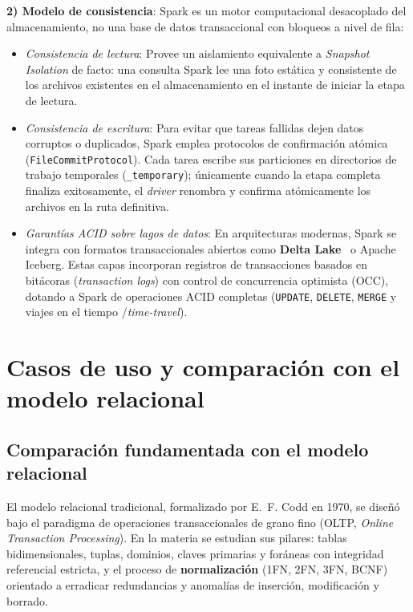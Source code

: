 \documentclass[conference,a4paper]{IEEEtran}
\begin{document}
\textbf{2) Modelo de consistencia}: Spark es un motor computacional desacoplado del almacenamiento, no una base de datos transaccional con bloqueos a nivel de fila:
\begin{itemize}
\item \textit{Consistencia de lectura}: Provee un aislamiento equivalente a \textit{Snapshot Isolation} de facto: una consulta Spark lee una foto estática y consistente de los archivos existentes en el almacenamiento en el instante de iniciar la etapa de lectura.
\item \textit{Consistencia de escritura}: Para evitar que tareas fallidas dejen datos corruptos o duplicados, Spark emplea protocolos de confirmación atómica (\texttt{FileCommitProtocol}). Cada tarea escribe sus particiones en directorios de trabajo temporales (\texttt{\_temporary}); únicamente cuando la etapa completa finaliza exitosamente, el \textit{driver} renombra y confirma atómicamente los archivos en la ruta definitiva.
\item \textit{Garantías ACID sobre lagos de datos}: En arquitecturas modernas, Spark se integra con formatos transaccionales abiertos como \textbf{Delta Lake}~\cite{armbrust2020deltalake} o Apache Iceberg. Estas capas incorporan registros de transacciones basados en bitácoras (\textit{transaction logs}) con control de concurrencia optimista (OCC), dotando a Spark de operaciones ACID completas (\texttt{UPDATE}, \texttt{DELETE}, \texttt{MERGE} y viajes en el tiempo /\textit{time-travel}).
\end{itemize}

\section{Casos de uso y comparación con el modelo relacional}
\label{sec:relacional}

\subsection{Comparación fundamentada con el modelo relacional}

El modelo relacional tradicional, formalizado por E.~F. Codd en 1970, se diseñó bajo el paradigma de operaciones transaccionales de grano fino (OLTP, \textit{Online Transaction Processing}). En la materia se estudian sus pilares: tablas bidimensionales, tuplas, dominios, claves primarias y foráneas con integridad referencial estricta, y el proceso de \textbf{normalización} (1FN, 2FN, 3FN, BCNF) orientado a erradicar redundancias y anomalías de inserción, modificación y borrado.
\end{document}
